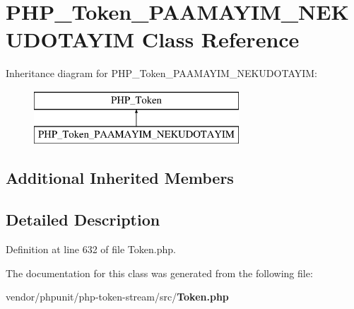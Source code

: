 \section{P\+H\+P\+\_\+\+Token\+\_\+\+P\+A\+A\+M\+A\+Y\+I\+M\+\_\+\+N\+E\+K\+U\+D\+O\+T\+A\+Y\+I\+M Class Reference}
\label{class_p_h_p___token___p_a_a_m_a_y_i_m___n_e_k_u_d_o_t_a_y_i_m}
Inheritance diagram for P\+H\+P\+\_\+\+Token\+\_\+\+P\+A\+A\+M\+A\+Y\+I\+M\+\_\+\+N\+E\+K\+U\+D\+O\+T\+A\+Y\+I\+M\+:\begin{figure}[H]
\begin{center}
\leavevmode
\includegraphics[height=2.000000cm]{class_p_h_p___token___p_a_a_m_a_y_i_m___n_e_k_u_d_o_t_a_y_i_m}
\end{center}
\end{figure}
\subsection*{Additional Inherited Members}


\subsection{Detailed Description}


Definition at line 632 of file Token.\+php.



The documentation for this class was generated from the following file\+:\begin{DoxyCompactItemize}
\item 
vendor/phpunit/php-\/token-\/stream/src/{\bf Token.\+php}\end{DoxyCompactItemize}
